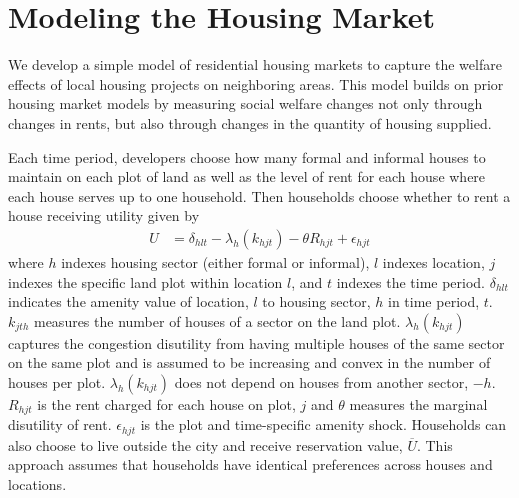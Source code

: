 \documentclass[12pt]{article}
\begin{document}
\section{Modeling the Housing Market}\label{section:theory}

We develop a simple model of residential housing markets to capture the welfare effects of local housing projects on neighboring areas.  This model builds on prior housing market models by measuring social welfare changes not only through changes in rents, but also through changes in the quantity of housing supplied.  



Each time period, developers choose how many formal and informal houses to maintain on each plot of land as well as the level of rent for each house where each house serves up to one household.  Then households choose whether to rent a house receiving utility given by
\begin{align*}
U &= \delta_{hlt} - \lambda_{h}(k_{hjt}) - \theta R_{hjt}   + \epsilon_{hjt}  
\end{align*}
\noindent where $h$ indexes housing sector (either formal or informal), $l$ indexes location, $j$ indexes the specific land plot within location $l$, and $t$ indexes the time period.  $\delta_{hlt}$ indicates the amenity value of location, $l$ to housing sector, $h$ in time period, $t$.  $k_{jth}$ measures the number of houses of a sector on the land plot.  $\lambda_{h}(k_{hjt})$ captures the congestion disutility from having multiple houses of the same sector on the same plot and is assumed to be increasing and convex in the number of houses per plot.   $\lambda_{h}(k_{hjt})$ does not depend on houses from another sector, $-h$.    $R_{hjt}$ is the rent charged for each house on plot, $j$ and $\theta$ measures the marginal disutility of rent.  $\epsilon_{hjt}$ is the plot and time-specific amenity shock.  Households can also choose to live outside the city and receive reservation value, $\overline{U}$.  This approach assumes that households have identical preferences across houses and locations.  
 
\end{document}
